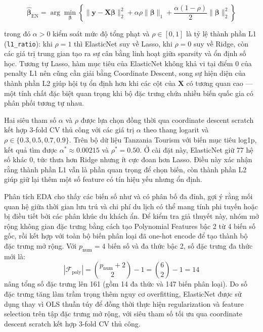\begin{equation}
    \hat{\boldsymbol{\beta}}_{\text{EN}} = \arg\min_{\boldsymbol{\beta}} \left\{ \|\mathbf{y} - \mathbf{X}\boldsymbol{\beta}\|_2^2 + \alpha\rho\|\boldsymbol{\beta}\|_1 + \frac{\alpha(1-\rho)}{2}\|\boldsymbol{\beta}\|_2^2 \right\}
\end{equation}

trong đó $\alpha > 0$ kiểm soát mức độ tổng phạt và $\rho \in [0,1]$ là tỷ lệ thành phần L1 (\texttt{l1\_ratio}): khi $\rho = 1$ thì ElasticNet suy về Lasso, khi $\rho = 0$ suy về Ridge, còn các giá trị trung gian tạo ra sự cân bằng linh hoạt giữa sparsity và ổn định số học. Tương tự Lasso, hàm mục tiêu của ElasticNet không khả vi tại điểm 0 của penalty L1 nên cũng cần giải bằng Coordinate Descent, song sự hiện diện của thành phần L2 giúp hội tụ ổn định hơn khi các cột của $\mathbf{X}$ có tương quan cao --- một tính chất đặc biệt quan trọng khi bộ đặc trưng chứa nhiều biến quốc gia có phân phối tương tự nhau.

Hai siêu tham số $\alpha$ và $\rho$ được lựa chọn đồng thời qua coordinate descent scratch kết hợp 3-fold CV thủ công với các giá trị $\alpha$ theo thang logarit và $\rho \in \{0.3, 0.5, 0.7, 0.9\}$. Trên bộ dữ liệu Tanzania Tourism với biến mục tiêu log1p, kết quả tìm được $\alpha^* \approx 0.00215$ và $\rho^* = 0.50$. Ở cài đặt này, ElasticNet giữ 77 hệ số khác 0, tức thưa hơn Ridge nhưng ít cực đoan hơn Lasso. Điều này xác nhận rằng thành phần L1 vẫn là phần quan trọng để chọn biến, còn thành phần L2 giúp giữ lại thêm một số feature có tín hiệu yếu nhưng ổn định.


Phân tích EDA cho thấy các biến số như  và  có phân bố đa đỉnh, gợi ý rằng mối quan hệ giữa thời gian lưu trú và chi phí du lịch có thể mang tính phi tuyến hoặc bị điều tiết bởi các phân khúc du khách ẩn. Để kiểm tra giả thuyết này, nhóm mở rộng không gian đặc trưng bằng cách tạo Polynomial Features bậc 2 từ 4 biến số gốc, rồi kết hợp với toàn bộ biến phân loại đã one-hot encode để tạo thành bộ đặc trưng mở rộng. Với $p_{\text{num}} = 4$ biến số và đa thức bậc 2, số đặc trưng đa thức mới là:
\begin{equation}
    \left|\mathcal{F}_{\text{poly}}\right| = \binom{p_{\text{num}} + 2}{2} - 1 = \binom{6}{2} - 1 = 14
\end{equation}
nâng tổng số đặc trưng lên 161 (gồm 14 đa thức và 147 biến phân loại). Do số đặc trưng tăng làm trầm trọng thêm nguy cơ overfitting, ElasticNet được sử dụng thay vì OLS thuần túy để đồng thời thực hiện regularization và feature selection trên tập đặc trưng mở rộng, với siêu tham số tối ưu qua coordinate descent scratch kết hợp 3-fold CV thủ công.

